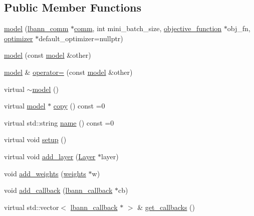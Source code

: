 \subsection*{Public Member Functions}
\begin{DoxyCompactItemize}
\item 
\hyperlink{classlbann_1_1model_a6feaee921c434bbfc32451ed874cc051}{model} (\hyperlink{classlbann_1_1lbann__comm}{lbann\+\_\+comm} $\ast$\hyperlink{file__io_8cpp_ab048c6f9fcbcfaa57ce68b00263dbebe}{comm}, int mini\+\_\+batch\+\_\+size, \hyperlink{classlbann_1_1objective__function}{objective\+\_\+function} $\ast$obj\+\_\+fn, \hyperlink{classlbann_1_1optimizer}{optimizer} $\ast$default\+\_\+optimizer=nullptr)
\item 
\hyperlink{classlbann_1_1model_a03fd1dc3edddb414b040bc009cf73371}{model} (const \hyperlink{classlbann_1_1model}{model} \&other)
\item 
\hyperlink{classlbann_1_1model}{model} \& \hyperlink{classlbann_1_1model_a05e8bd6c745ce4414be98462147ec52e}{operator=} (const \hyperlink{classlbann_1_1model}{model} \&other)
\item 
virtual \hyperlink{classlbann_1_1model_ae97a8048de182af3ed8a6fbd92212958}{$\sim$model} ()
\item 
virtual \hyperlink{classlbann_1_1model}{model} $\ast$ \hyperlink{classlbann_1_1model_aacd024c11f0897b33a7e7838b9433ba2}{copy} () const =0
\item 
virtual std\+::string \hyperlink{classlbann_1_1model_a7e471599eded909c4ce7178689dd13b6}{name} () const =0
\item 
virtual void \hyperlink{classlbann_1_1model_afd9dbca79503a40b7aa5c78da4d6f391}{setup} ()
\item 
virtual void \hyperlink{classlbann_1_1model_a5dfa9895024f07d273062b67d7a0dc01}{add\+\_\+layer} (\hyperlink{classlbann_1_1Layer}{Layer} $\ast$layer)
\item 
void \hyperlink{classlbann_1_1model_af35fca77e75eb6dd570e4727aa3d5b6b}{add\+\_\+weights} (\hyperlink{classlbann_1_1weights}{weights} $\ast$w)
\item 
void \hyperlink{classlbann_1_1model_a8f45cdca82dbc0cc1f519898474cc6ec}{add\+\_\+callback} (\hyperlink{classlbann_1_1lbann__callback}{lbann\+\_\+callback} $\ast$cb)
\item 
virtual std\+::vector$<$ \hyperlink{classlbann_1_1lbann__callback}{lbann\+\_\+callback} $\ast$ $>$ \& \hyperlink{classlbann_1_1model_a38c71a455870e087c4c07acb78e4477c}{get\+\_\+callbacks} ()
\item 

\end{DoxyCompactItemize}
